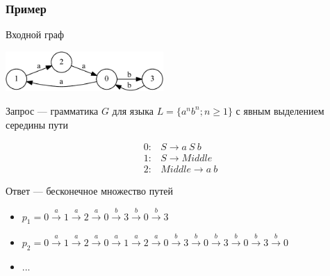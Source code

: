 \documentclass[xcolor=table]{beamer}
\begin{document}
\begin{frame}[fragile]
  \transwipe[direction=90]
  \frametitle{Пример}
Входной граф \\
\begin{center}
        \includegraphics[width=0.45\textwidth]{pictures/input.pdf} 
\end{center}
Запрос --- грамматика $G$ для языка $L=\{a^n b^n; n \geq 1\}$ с явным выделением середины пути \\
\begin{center}
   \[
\begin{array}{rl} 
   0:& S \rightarrow a \ S \ b \\
   1:& S \rightarrow Middle \\
   2:& Middle \rightarrow a \ b
\end{array}
\]
\end{center}
\vspace{0.8em}
Ответ --- бесконечное множество путей
\begin{itemize}
\item $p_1 = 0\xrightarrow{a}1\xrightarrow{a}2\xrightarrow{a}0\xrightarrow{b}3\xrightarrow{b}0\xrightarrow{b}3$
\item $p_2 = 0\xrightarrow{a}1\xrightarrow{a}2\xrightarrow{a}0\xrightarrow{a}1\xrightarrow{a}2\xrightarrow{a}0\xrightarrow{b}3\xrightarrow{b}0\xrightarrow{b}3\xrightarrow{b}0\xrightarrow{b}3\xrightarrow{b}0$
\item ...
\end{itemize}

\end{frame}
\end{document}
